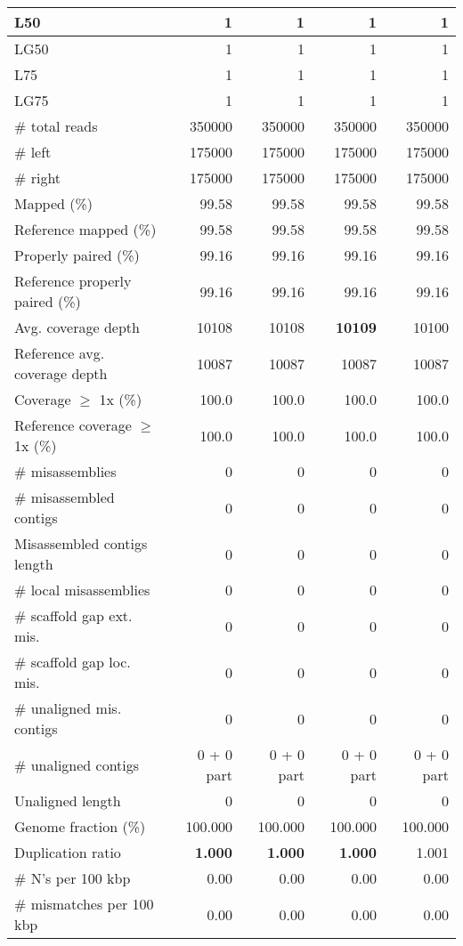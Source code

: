 \documentclass[12pt,a4paper]{article}
\begin{document}
\begin{table}[ht]
\begin{center}
\begin{tabular}{|l*{4}{|r}|}
L50 & 1 & 1 & 1 & 1 \\ \hline
LG50 & 1 & 1 & 1 & 1 \\ \hline
L75 & 1 & 1 & 1 & 1 \\ \hline
LG75 & 1 & 1 & 1 & 1 \\ \hline
\# total reads & 350000 & 350000 & 350000 & 350000 \\ \hline
\# left & 175000 & 175000 & 175000 & 175000 \\ \hline
\# right & 175000 & 175000 & 175000 & 175000 \\ \hline
Mapped (\%) & 99.58 & 99.58 & 99.58 & 99.58 \\ \hline
Reference mapped (\%) & 99.58 & 99.58 & 99.58 & 99.58 \\ \hline
Properly paired (\%) & 99.16 & 99.16 & 99.16 & 99.16 \\ \hline
Reference properly paired (\%) & 99.16 & 99.16 & 99.16 & 99.16 \\ \hline
Avg. coverage depth & 10108 & 10108 & {\bf 10109} & 10100 \\ \hline
Reference avg. coverage depth & 10087 & 10087 & 10087 & 10087 \\ \hline
Coverage $\geq$ 1x (\%) & 100.0 & 100.0 & 100.0 & 100.0 \\ \hline
Reference coverage $\geq$ 1x (\%) & 100.0 & 100.0 & 100.0 & 100.0 \\ \hline
\# misassemblies & 0 & 0 & 0 & 0 \\ \hline
\# misassembled contigs & 0 & 0 & 0 & 0 \\ \hline
Misassembled contigs length & 0 & 0 & 0 & 0 \\ \hline
\# local misassemblies & 0 & 0 & 0 & 0 \\ \hline
\# scaffold gap ext. mis. & 0 & 0 & 0 & 0 \\ \hline
\# scaffold gap loc. mis. & 0 & 0 & 0 & 0 \\ \hline
\# unaligned mis. contigs & 0 & 0 & 0 & 0 \\ \hline
\# unaligned contigs & 0 + 0 part & 0 + 0 part & 0 + 0 part & 0 + 0 part \\ \hline
Unaligned length & 0 & 0 & 0 & 0 \\ \hline
Genome fraction (\%) & 100.000 & 100.000 & 100.000 & 100.000 \\ \hline
Duplication ratio & {\bf 1.000} & {\bf 1.000} & {\bf 1.000} & 1.001 \\ \hline
\# N's per 100 kbp & 0.00 & 0.00 & 0.00 & 0.00 \\ \hline
\# mismatches per 100 kbp & 0.00 & 0.00 & 0.00 & 0.00 \\ \hline

\end{tabular}
\end{center}
\end{table}
\end{document}
